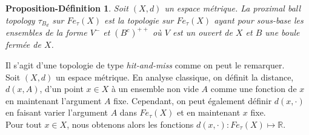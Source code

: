 \documentclass[11pt]{report}
\newenvironment{boxdefinition}
{\begin{tcolorbox}
		[enhanced jigsaw,breakable,pad at break*=1mm,
		colback=black!5!white,boxrule=0pt,frame hidden,
		borderline west={1.5mm}{-2mm}{blue}]}
	{\end{tcolorbox}}
\theoremstyle{styletheorem}
\theoremstyle{styledef}
\newtheorem{propozition}[theoreme]{Proposition-Définition}
\theoremstyle{remark}
\newenvironment{propdf}{\vspace*{0.3cm}\begin{boxdefinition}\begin{propozition}}{\end{propozition}\end{boxdefinition}\vspace*{0.3cm}}
\newcommand{\R}{\ensuremath{\mathbb{R}}}
\newcommand{\Fe}{\ensuremath{Fe_{\tau}(X)}}
\begin{document}
\begin{propdf}
	Soit $(X,d)$ un espace métrique. La proximal ball topology $\tau_{B_d}$ sur $\Fe$ est la topologie sur $\Fe$ ayant pour sous-base les ensembles de la forme $V^-$ et $(B^c)^{++}$ où $V$ est un ouvert de $X$ et $B$ une boule fermée de $X$.
\end{propdf}
Il s'agit d'une topologie de type \textit{hit-and-miss} comme on peut le remarquer.\\

Soit $(X,d)$ un espace métrique. En analyse classique, on définit la distance, $d(x,A)$,  d'un point $x \in X$ à un ensemble non vide $A$ comme une fonction de $x$ en maintenant l'argument $A$ fixe. Cependant, on peut également définir $d(x,\cdot)$ en faisant  varier l'argument $A$ dans $\Fe$  et en maintenant $x$ fixe. \\
Pour tout $x \in X$, nous obtenons alors les fonctions $d(x,\cdot) \colon \Fe \longmapsto \R$.
\end{document}
